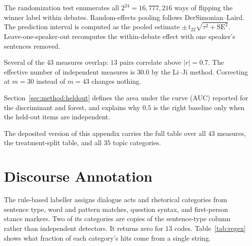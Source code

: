 \documentclass[pdflatex,sn-mathphys-num]{sn-jnl}%
\begin{document}
\begin{appendices}
The randomization test enumerates all $2^{24} = 16{,}777{,}216$ ways of
flipping the winner label within debates. Random-effects pooling follows
DerSimonian--Laird. The prediction interval is computed as the pooled
estimate $\pm\, t_{22}\sqrt{\tau^2 + \mathrm{SE}^2}$. Leave-one-speaker-out
recomputes the within-debate effect with one speaker's sentences removed.

Several of the $43$ measures overlap: $13$ pairs correlate above $|r| =
0.7$. The effective number of independent measures is $30.0$ by the Li--Ji
method. Correcting at $m = 30$ instead of $m = 43$ changes nothing.

Section~\ref{sec:method:heldout} defines the area under the curve (AUC)
reported for the discriminant and forest, and explains why $0.5$ is the
right baseline only when the held-out items are independent.

The deposited version of this appendix carries the full table over all $43$
measures, the treatment-split table, and all $35$ topic categories.

\section{Discourse Annotation}
\label{app:tagging}

The rule-based labeller assigns dialogue acts and rhetorical categories from
sentence type, word and pattern matches, question syntax, and first-person
stance markers. Two of its categories are copies of the sentence-type column
rather than independent detectors. It returns zero for $13$ codes.
Table~\ref{tab:regex} shows what fraction of each category's hits come from
a single string.


\end{appendices}
\end{document}
